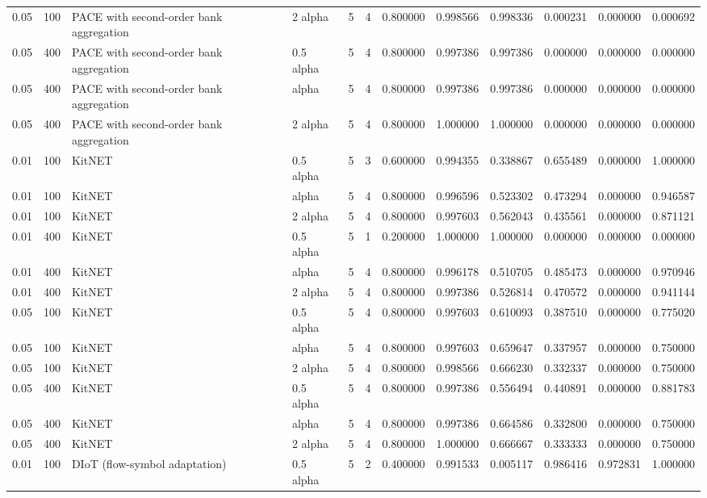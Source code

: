 \begin{tabular}{llllllllllll}
0.05 & 100 & PACE with second-order bank aggregation & 2 alpha & 5 & 4 & 0.800000 & 0.998566 & 0.998336 & 0.000231 & 0.000000 & 0.000692 \\
0.05 & 400 & PACE with second-order bank aggregation & 0.5 alpha & 5 & 4 & 0.800000 & 0.997386 & 0.997386 & 0.000000 & 0.000000 & 0.000000 \\
0.05 & 400 & PACE with second-order bank aggregation & alpha & 5 & 4 & 0.800000 & 0.997386 & 0.997386 & 0.000000 & 0.000000 & 0.000000 \\
0.05 & 400 & PACE with second-order bank aggregation & 2 alpha & 5 & 4 & 0.800000 & 1.000000 & 1.000000 & 0.000000 & 0.000000 & 0.000000 \\
0.01 & 100 & KitNET & 0.5 alpha & 5 & 3 & 0.600000 & 0.994355 & 0.338867 & 0.655489 & 0.000000 & 1.000000 \\
0.01 & 100 & KitNET & alpha & 5 & 4 & 0.800000 & 0.996596 & 0.523302 & 0.473294 & 0.000000 & 0.946587 \\
0.01 & 100 & KitNET & 2 alpha & 5 & 4 & 0.800000 & 0.997603 & 0.562043 & 0.435561 & 0.000000 & 0.871121 \\
0.01 & 400 & KitNET & 0.5 alpha & 5 & 1 & 0.200000 & 1.000000 & 1.000000 & 0.000000 & 0.000000 & 0.000000 \\
0.01 & 400 & KitNET & alpha & 5 & 4 & 0.800000 & 0.996178 & 0.510705 & 0.485473 & 0.000000 & 0.970946 \\
0.01 & 400 & KitNET & 2 alpha & 5 & 4 & 0.800000 & 0.997386 & 0.526814 & 0.470572 & 0.000000 & 0.941144 \\
0.05 & 100 & KitNET & 0.5 alpha & 5 & 4 & 0.800000 & 0.997603 & 0.610093 & 0.387510 & 0.000000 & 0.775020 \\
0.05 & 100 & KitNET & alpha & 5 & 4 & 0.800000 & 0.997603 & 0.659647 & 0.337957 & 0.000000 & 0.750000 \\
0.05 & 100 & KitNET & 2 alpha & 5 & 4 & 0.800000 & 0.998566 & 0.666230 & 0.332337 & 0.000000 & 0.750000 \\
0.05 & 400 & KitNET & 0.5 alpha & 5 & 4 & 0.800000 & 0.997386 & 0.556494 & 0.440891 & 0.000000 & 0.881783 \\
0.05 & 400 & KitNET & alpha & 5 & 4 & 0.800000 & 0.997386 & 0.664586 & 0.332800 & 0.000000 & 0.750000 \\
0.05 & 400 & KitNET & 2 alpha & 5 & 4 & 0.800000 & 1.000000 & 0.666667 & 0.333333 & 0.000000 & 0.750000 \\
0.01 & 100 & DIoT (flow-symbol adaptation) & 0.5 alpha & 5 & 2 & 0.400000 & 0.991533 & 0.005117 & 0.986416 & 0.972831 & 1.000000 \\

\end{tabular}
